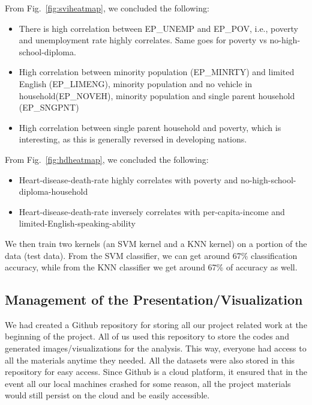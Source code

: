 \documentclass[journal,12pt,onecolumn]{IEEEtran}
\begin{document}
From Fig.~\ref{fig:sviheatmap}, we concluded the following:
\begin{itemize}
\item There is high correlation between EP\_UNEMP and EP\_POV, i.e., poverty and unemployment rate highly correlates. Same goes for poverty vs no-high-school-diploma.
\item High correlation between minority population (EP\_MINRTY) and limited English (EP\_LIMENG), minority population and no vehicle in household(EP\_NOVEH), minority population and single parent household (EP\_SNGPNT)
\item High correlation between single parent household and poverty, which is interesting, as this is generally reversed in developing nations.
\end{itemize}

From Fig.~\ref{fig:hdheatmap}, we concluded the following:
\begin{itemize}
\item Heart-disease-death-rate highly correlates with poverty and no-high-school-diploma-household
\item Heart-disease-death-rate inversely correlates with per-capita-income and limited-English-speaking-ability
\end{itemize}


We then train two kernels (an SVM kernel and a KNN kernel) on a portion of the data (test data).
From the SVM classifier, we can get around 67\% classification accuracy, while from the KNN classifier we get around 67\% of accuracy as well.

\subsection{Management of the Presentation/Visualization}
We had created a Github repository for storing all our project related work at the beginning of the project.
All of us used this repository to store the codes and generated images/visualizations for the analysis.
This way, everyone had access to all the materials anytime they needed.
All the datasets were also stored in this repository for easy access.
Since Github is a cloud platform, it ensured that in the event all our local machines crashed for some reason, all the project materials would still persist on the cloud and be easily accessible.
\end{document}
